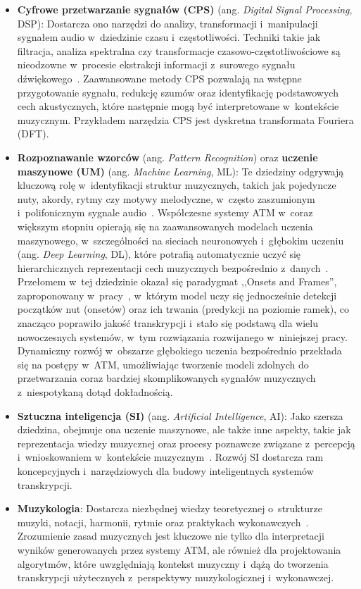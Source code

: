 \begin{itemize}
    \item \textbf{Cyfrowe przetwarzanie sygnałów (CPS)} (ang. \textit{Digital Signal Processing}, DSP): Dostarcza ono narzędzi do analizy, transformacji i~manipulacji sygnałem audio w~dziedzinie czasu i~częstotliwości. Techniki takie jak filtracja, analiza spektralna czy transformacje czasowo-częstotliwościowe są nieodzowne w~procesie ekstrakcji informacji z~surowego sygnału dźwiękowego~\autocite{KlapuriDavy2006SignalProcessing}. Zaawansowane metody CPS pozwalają na wstępne przygotowanie sygnału, redukcję szumów oraz identyfikację podstawowych cech akustycznych, które następnie mogą być interpretowane w~kontekście muzycznym. Przykładem narzędzia CPS jest dyskretna transformata Fouriera (DFT).
    \item \textbf{Rozpoznawanie wzorców} (ang. \textit{Pattern Recognition}) oraz \textbf{uczenie maszynowe (UM)} (ang. \textit{Machine Learning}, ML): Te dziedziny odgrywają kluczową rolę w~identyfikacji struktur muzycznych, takich jak pojedyncze nuty, akordy, rytmy czy motywy melodyczne, w~często zaszumionym i~polifonicznym sygnale audio~\autocite{Benetos2019AutomaticMusicTranscription}. Współczesne systemy ATM w~coraz większym stopniu opierają się na zaawansowanych modelach uczenia maszynowego, w~szczególności na sieciach neuronowych i~głębokim uczeniu (ang. \textit{Deep Learning}, DL), które potrafią automatycznie uczyć się hierarchicznych reprezentacji cech muzycznych bezpośrednio z~danych~\autocite{BurletHindle2017IsolatedGuitarTranscription}. Przełomem w~tej dziedzinie okazał się paradygmat ,,Onsets and Frames'', zaproponowany w~pracy~\autocite{Hawthorne2018Onsets}, w~którym model uczy się jednocześnie detekcji początków nut (onsetów) oraz ich trwania (predykcji na poziomie ramek), co znacząco poprawiło jakość transkrypcji i~stało się podstawą dla wielu nowoczesnych systemów, w~tym rozwiązania rozwijanego w~niniejszej pracy. Dynamiczny rozwój w~obszarze głębokiego uczenia bezpośrednio przekłada się na postępy w~ATM, umożliwiając tworzenie modeli zdolnych do przetwarzania coraz bardziej skomplikowanych sygnałów muzycznych z~niespotykaną dotąd dokładnością.
    \item \textbf{Sztuczna inteligencja (SI)} (ang. \textit{Artificial Intelligence}, AI): Jako szersza dziedzina, obejmuje ona uczenie maszynowe, ale także inne aspekty, takie jak reprezentacja wiedzy muzycznej oraz procesy poznawcze związane z~percepcją i~wnioskowaniem w~kontekście muzycznym~\autocite{Benetos2019AutomaticMusicTranscription}. Rozwój SI dostarcza ram koncepcyjnych i~narzędziowych dla budowy inteligentnych systemów transkrypcji.
    \item \textbf{Muzykologia}: Dostarcza niezbędnej wiedzy teoretycznej o~strukturze muzyki, notacji, harmonii, rytmie oraz praktykach wykonawczych~\autocite{Holzapfel2019Ethnomusicology}. Zrozumienie zasad muzycznych jest kluczowe nie tylko dla interpretacji wyników generowanych przez systemy ATM, ale również dla projektowania algorytmów, które uwzględniają kontekst muzyczny i~dążą do tworzenia transkrypcji użytecznych z~perspektywy muzykologicznej i~wykonawczej.
\end{itemize}


